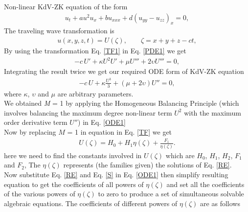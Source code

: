 \documentclass{article}
\numberwithin{equation}{section}
\begin{document}
Non-linear KdV-ZK equation of the form
\begin{eqnarray}\label{PDE1}
u_{t}+a u^2 u_{x}+b u_{xxx}+d(u_{yy}-u_{zz})_{x}=0,
\end{eqnarray}
The traveling wave transformation is
\begin{eqnarray}\label{TF1}
u(x,y,z,t)=U(\zeta), \qquad \zeta=x+y+z-ct,
\end{eqnarray}
By using the transformation Eq. \ref{TF1} in  Eq. \ref{PDE1} we get
\begin{eqnarray}
    -c\,U'+\kappa U^2 U'+ \mu U'''+2\upsilon U'''=0,
\end{eqnarray}
Integrating the result twice we get our required ODE form of KdV-ZK equation
\begin{eqnarray}\label{ODE1}
    -c\,U+\kappa \frac{U^3}{3}+ (\mu+2\upsilon)U''=0,
\end{eqnarray}
where $\kappa$, $\upsilon$ and $\mu$ are arbitrary parameters.\\
We obtained \emph{M} = 1 by applying the Homogeneous Balancing Principle (which involves balancing the maximum degree non-linear term $U^{2}$ with the maximum order derivative term $U''$) in Eq. \ref{ODE1} \\
Now by replacing $M$ = 1 in equation in Eq. \ref{TF} we get
\begin{eqnarray}\label{S}
U  \left(\zeta \right) =H_{0}+H_{1} \eta \left(\zeta \right)+\frac{F_{1}}{\eta \left(\zeta \right)}.
\end{eqnarray}
here we need to find the constants involved in $U{(\zeta)}$ which are $H_{0}$, $H_{1}$, $H_{2}$, $F_{1}$ and $F_{2}$,
The $\eta{(\zeta)}$ represents (the families given) the solutions of Eq. \ref{RE}.\\
Now substitute Eq. \ref{RE} and Eq. \ref{S} in Eq. \ref{ODE1} then simplify resulting equation to get the coefficients of all powers of ${\eta(\zeta)}$ and set all the coefficients of the various powers of $\eta{(\zeta)}$ to zero to produce a set of simultaneous solvable algebraic equations.
The coefficients of different powers of $\eta{(\zeta)}$ are as follows\\
\end{document}
